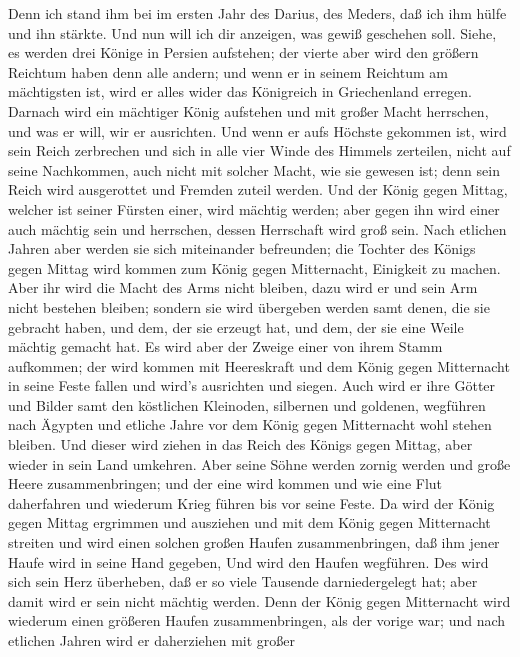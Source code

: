  Denn ich stand ihm bei im ersten Jahr des Darius, des
Meders, daß ich ihm hülfe und ihn stärkte.  Und nun will ich
dir anzeigen, was gewiß geschehen soll. Siehe, es werden drei Könige in
Persien aufstehen; der vierte aber wird den größern Reichtum haben denn
alle andern; und wenn er in seinem Reichtum am mächtigsten ist, wird er
alles wider das Königreich in Griechenland erregen.  Darnach
wird ein mächtiger König aufstehen und mit großer Macht herrschen, und
was er will, wir er ausrichten.  Und wenn er aufs Höchste
gekommen ist, wird sein Reich zerbrechen und sich in alle vier Winde des
Himmels zerteilen, nicht auf seine Nachkommen, auch nicht mit solcher
Macht, wie sie gewesen ist; denn sein Reich wird ausgerottet und Fremden
zuteil werden.  Und der König gegen Mittag, welcher ist
seiner Fürsten einer, wird mächtig werden; aber gegen ihn wird einer
auch mächtig sein und herrschen, dessen Herrschaft wird groß sein.
 Nach etlichen Jahren aber werden sie sich miteinander
befreunden; die Tochter des Königs gegen Mittag wird kommen zum König
gegen Mitternacht, Einigkeit zu machen. Aber ihr wird die Macht des Arms
nicht bleiben, dazu wird er und sein Arm nicht bestehen bleiben; sondern
sie wird übergeben werden samt denen, die sie gebracht haben, und dem,
der sie erzeugt hat, und dem, der sie eine Weile mächtig gemacht hat.
 Es wird aber der Zweige einer von ihrem Stamm aufkommen;
der wird kommen mit Heereskraft und dem König gegen Mitternacht in seine
Feste fallen und wird's ausrichten und siegen.  Auch wird er
ihre Götter und Bilder samt den köstlichen Kleinoden, silbernen und
goldenen, wegführen nach Ägypten und etliche Jahre vor dem König gegen
Mitternacht wohl stehen bleiben.  Und dieser wird ziehen in
das Reich des Königs gegen Mittag, aber wieder in sein Land umkehren.
 Aber seine Söhne werden zornig werden und große Heere
zusammenbringen; und der eine wird kommen und wie eine Flut daherfahren
und wiederum Krieg führen bis vor seine Feste.  Da wird der
König gegen Mittag ergrimmen und ausziehen und mit dem König gegen
Mitternacht streiten und wird einen solchen großen Haufen
zusammenbringen, daß ihm jener Haufe wird in seine Hand gegeben,
 Und wird den Haufen wegführen. Des wird sich sein Herz
überheben, daß er so viele Tausende darniedergelegt hat; aber damit wird
er sein nicht mächtig werden.  Denn der König gegen
Mitternacht wird wiederum einen größeren Haufen zusammenbringen, als der
vorige war; und nach etlichen Jahren wird er daherziehen mit großer

